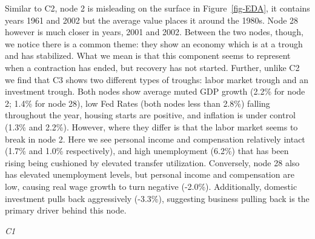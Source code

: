 \documentclass[10pt, letterpaper]{article}
\begin{document}
Similar to C2, node 2 is misleading on the surface in
Figure~\ref{fig-EDA}, it contains years 1961 and 2002 but the average
value places it around the 1980s. Node 28 however is much closer in
years, 2001 and 2002. Between the two nodes, though, we notice there is
a common theme: they show an economy which is at a trough and has
stabilized. What we mean is that this component seems to represent when
a contraction has ended, but recovery has not started. Further, unlike
C2 we find that C3 shows two different types of troughs: labor market
trough and an investment trough. Both nodes show average muted GDP
growth (2.2\% for node 2; 1.4\% for node 28), low Fed Rates (both nodes
less than 2.8\%) falling throughout the year, housing starts are
positive, and inflation is under control (1.3\% and 2.2\%). However,
where they differ is that the labor market seems to break in node 2.
Here we see personal income and compensation relatively intact (1.7\%
and 1.0\% respectively), and high unemployment (6.2\%) that has been
rising being cushioned by elevated transfer utilization. Conversely,
node 28 also has elevated unemployment levels, but personal income and
compensation are low, causing real wage growth to turn negative
(-2.0\%). Additionally, domestic investment pulls back aggressively
(-3.3\%), suggesting business pulling back is the primary driver behind
this node.

\emph{C1}
\end{document}
